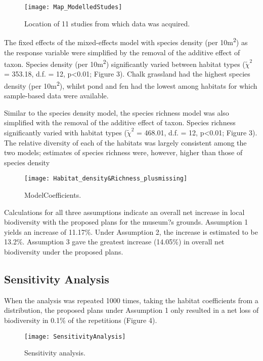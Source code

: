 \begin{figure}[t]
	\centering
	\texttt{[image: Map\_ModelledStudes]}
	\caption{Location of 11 studies from which data was acquired.}
   	 \label{fig:wlgmap}
\end{figure}


The fixed effects of the mixed-effects model with species density (per 10m\textsuperscript{2}) as the response variable were simplified by the removal of the additive effect of taxon. Species density (per 10m\textsuperscript{2}) significantly varied between habitat types ($\tilde{\chi}^2$ = 353.18, d.f. = 12, p<0.01; Figure 3). Chalk grassland had the highest species density (per 10m\textsuperscript{2}), whilst pond and fen had the lowest among habitats for which sample-based data were available. 

Similar to the species density model, the species richness model was also simplified with the removal of the additive effect of taxon.  Species richness significantly varied with habitat types ($\tilde{\chi}^2$ = 468.01, d.f. = 12, p<0.01; Figure 3).  The relative diversity of each of the habitats was largely consistent among the two models; estimates of species richness were, however, higher than those of species density

\begin{figure}[t]
	\centering
	\texttt{[image: Habitat\_density\&Richness\_plusmissing]}
	\caption{ModelCoefficients.}
   	 \label{fig:wlgmodel}
\end{figure}
	 	
Calculations for all three assumptions indicate an overall net increase in local biodiversity with the proposed plans for the museum?s grounds. Assumption 1 yields an increase of 11.17\%. Under Assumption 2, the increase is estimated to be 13.2\%. Assumption 3 gave the greatest increase (14.05\%) in overall net biodiversity under the proposed plans.

\subsection{Sensitivity Analysis}
When the analysis was repeated 1000 times, taking the habitat coefficients from a distribution, the proposed plans under Assumption 1 only resulted in a net loss of biodiversity in 0.1\% of the repetitions (Figure 4).

\begin{figure}[t]
	\centering
	\texttt{[image: SensitivityAnalysis]}
	\caption{Sensitivity analysis.}
   	 \label{fig:wlgsensitivity}
\end{figure}

